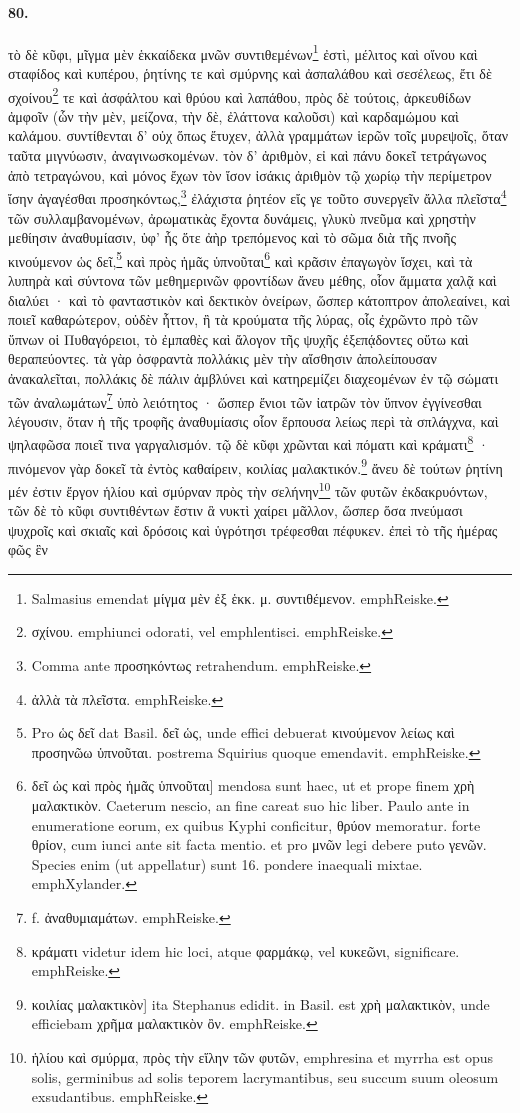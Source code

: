 \documentclass[a4paper, 11pt, oneside, polutonikogreek, german]{article}
\begin{document}
\paragraph{80.}
τὸ δὲ κῦφι, μῖγμα μὲν ἑκκαίδεκα μνῶν συντιθεμένων\footnote{Salmasius emendat μίγμα μὲν ἐξ ἑκκ. μ. συντιθέμενον. emph{Reiske.}} ἐστὶ, μέλιτος καὶ οἴνου καὶ σταφίδος καὶ κυπέρου, ῥητίνης τε καὶ σμύρνης καὶ ἀσπαλάθου καὶ σεσέλεως, ἔτι δὲ σχοίνου\footnote{σχίνου. emph{iunci odorati}, vel emph{lentisci}. emph{Reiske.}} τε καὶ ἀσφάλτου καὶ θρύου καὶ λαπάθου, πρὸς δὲ τούτοις, ἀρκευθίδων ἀμφοῖν (ὧν τὴν μὲν, μείζονα, τὴν δὲ, ἐλάττονα καλοῦσι) καὶ καρδαμώμου καὶ καλάμου. συντίθενται δ' οὐχ ὅπως ἔτυχεν, ἀλλὰ γραμμάτων ἱερῶν τοῖς μυρεψοῖς, ὅταν ταῦτα μιγνύωσιν, ἀναγινωσκομένων. τὸν δ' ἀριθμὸν, εἰ καὶ πάνυ δοκεῖ τετράγωνος ἀπὸ τετραγώνου, καὶ μόνος ἔχων τὸν ἴσον ἰσάκις ἀριθμὸν τῷ χωρίῳ τὴν περίμετρον ἴσην ἀγαγέσθαι προσηκόντως,\footnote{Comma ante προσηκόντως retrahendum. emph{Reiske.}} ἐλάχιστα ῥητέον εἴς γε τοῦτο συνεργεῖν ἄλλα πλεῖστα\footnote{ἀλλὰ τὰ πλεῖστα. emph{Reiske.}} τῶν συλλαμβανομένων, ἀρωματικὰς ἔχοντα δυνάμεις, γλυκὺ πνεῦμα καὶ χρηστὴν μεθίησιν ἀναθυμίασιν, ὑφ' ἧς ὅτε ἀὴρ τρεπόμενος καὶ τὸ σῶμα διὰ τῆς πνοῆς κινούμενον ὡς δεῖ,\footnote{Pro ὡς δεῖ dat Basil. δεῖ ὡς, unde effici debuerat κινούμενον λείως καὶ προσηνῶω ὑπνοῦται. postrema Squirius quoque emendavit. emph{Reiske.}} καὶ πρὸς ἡμᾶς ὑπνοῦται\footnote{δεῖ ὡς καὶ πρὸς ἡμᾶς ὑπνοῦται] mendosa sunt haec, ut et prope finem χρὴ μαλακτικὸν. Caeterum nescio, an fine careat suo hic liber. Paulo ante in enumeratione eorum, ex quibus Kyphi conficitur, θρύον memoratur. forte θρίον, cum iunci ante sit facta mentio. et pro μνῶν legi debere puto γενῶν. Species enim (ut appellatur) sunt 16. pondere inaequali mixtae. emph{Xylander.} } καὶ κρᾶσιν ἐπαγωγὸν ἴσχει, καὶ τὰ λυπηρὰ καὶ σύντονα τῶν μεθημερινῶν φροντίδων ἄνευ μέθης, οἷον ἅμματα χαλᾷ καὶ διαλύει · καὶ τὸ φανταστικὸν καὶ δεκτικὸν ὀνείρων, ὥσπερ κάτοπτρον ἀπολεαίνει, καὶ ποιεῖ καθαρώτερον, οὐδὲν ἧττον, ἢ τὰ κρούματα τῆς λύρας, οἷς ἐχρῶντο πρὸ τῶν ὕπνων οἱ Πυθαγόρειοι, τὸ ἐμπαθὲς καὶ ἄλογον τῆς ψυχῆς ἐξεπᾴδοντες οὕτω καὶ θεραπεύοντες. τὰ γὰρ ὀσφραντὰ πολλάκις μὲν τὴν αἴσθησιν ἀπολείπουσαν ἀνακαλεῖται, πολλάκις δὲ πάλιν ἀμβλύνει καὶ κατηρεμίζει διαχεομένων ἐν τῷ σώματι τῶν ἀναλωμάτων\footnote{f. ἀναθυμιαμάτων. emph{Reiske.}} ὑπὸ λειότητος · ὥσπερ ἔνιοι τῶν ἰατρῶν τὸν ὕπνον ἐγγίνεσθαι λέγουσιν, ὅταν ἡ τῆς τροφῆς ἀναθυμίασις οἷον ἕρπουσα λείως περὶ τὰ σπλάγχνα, καὶ ψηλαφῶσα ποιεῖ τινα γαργαλισμόν. τῷ δὲ κῦφι χρῶνται καὶ πόματι καὶ κράματι\footnote{κράματι videtur idem hic loci, atque φαρμάκῳ, vel κυκεῶνι, significare. emph{Reiske.}} · πινόμενον γὰρ δοκεῖ τὰ ἐντὸς καθαίρειν, κοιλίας μαλακτικόν.\footnote{κοιλίας μαλακτικὸν] ita Stephanus edidit. in Basil. est χρὴ μαλακτικὸν, unde efficiebam χρῆμα μαλακτικὸν ὂν. emph{Reiske.}} ἄνευ δὲ τούτων ῥητίνη μέν ἐστιν ἔργον ἡλίου καὶ σμύρναν πρὸς τὴν σελήνην\footnote{ἡλίου καὶ σμύρμα, πρὸς τὴν εἵλην τῶν φυτῶν, emph{resina et myrrha est opus solis, germinibus ad solis teporem lacrymantibus}, seu succum suum oleosum exsudantibus. emph{Reiske.}} τῶν φυτῶν ἐκδακρυόντων, τῶν δὲ τὸ κῦφι συντιθέντων ἔστιν ἃ νυκτὶ χαίρει μᾶλλον, ὥσπερ ὅσα πνεύμασι ψυχροῖς καὶ σκιαῖς καὶ δρόσοις καὶ ὑγρότησι τρέφεσθαι πέφυκεν. ἐπεὶ τὸ τῆς ἡμέρας φῶς ἓν 
\end{document}
